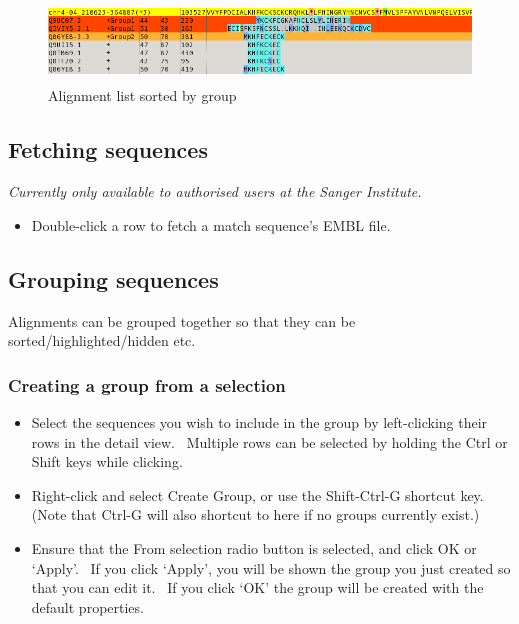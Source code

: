 \documentclass[letterpaper]{article}
\newcommand\liststyleWWviiiNumxvi{%
\renewcommand\labelitemi{{\textbullet}}
\renewcommand\labelitemii{o}
\renewcommand\labelitemiii{[F0A7?]}
\renewcommand\labelitemiv{[F0B7?]}
}
\begin{document}
\begin{figure}
\centering
\color[rgb]{0.30980393,0.5058824,0.7411765}
\includegraphics[width=13.721cm,height=2.164cm]{img_view_sort_by_group.png}
\caption{Alignment list sorted by group}
\end{figure}

\bigskip

{\color[rgb]{0.30980393,0.5058824,0.7411765}\subsection[Fetching sequences]{Fetching sequences}}
\hypertarget{RefHeading2021056909880}{}{\itshape
Currently only available to authorised users at the Sanger Institute.}

\liststyleWWviiiNumxvi
\begin{itemize}
\item {Double-click a row to fetch a match sequence{\textquoteright}s EMBL
file.}
\end{itemize}

{\color[rgb]{0.30980393,0.5058824,0.7411765}\subsection[Grouping sequences]{Grouping sequences}}
\hypertarget{RefHeading2041056909880}{}{
Alignments can be grouped together so that they can be
sorted/highlighted/hidden etc.}

{\color[rgb]{0.30980393,0.5058824,0.7411765}\subsubsection[Creating a group from a selection]{Creating a group from a selection}}
\hypertarget{RefHeading2061056909880}{}\liststyleWWviiiNumxvi
\begin{itemize}
\item {
Select the sequences you wish to include in the group by left-clicking
their rows in the detail view. \ Multiple rows can be selected by
holding the Ctrl or Shift keys while clicking.}
\item {
Right-click and select {\textquotesingle}Create Group{\textquotesingle},
or use the Shift-Ctrl-G shortcut key. (Note that Ctrl-G will also
shortcut to here if no groups currently exist.)}
\item {
Ensure that the {\textquotesingle}From selection{\textquotesingle} radio
button is selected, and click {\textquotesingle}OK{\textquotesingle} or
{\textquoteleft}Apply{\textquoteright}. \ If you click
{\textquoteleft}Apply{\textquoteright}, you will be shown the group you
just created so that you can edit it. \ If you click
{\textquoteleft}OK{\textquoteright} the group will be created with the
default properties.}
\end{itemize}
\end{document}
